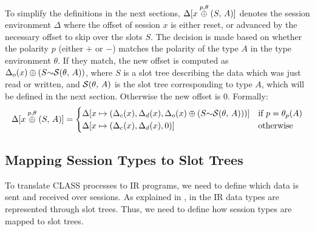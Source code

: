 To simplify the definitions in the next sections, $\Delta[x \overset{p,\theta}{\oplus} (S,\,A)]$ denotes the session environment $\Delta$ where the offset of session $x$ is either reset, or advanced by the necessary offset to skip over the slots $S$. The decision is made based on whether the polarity $p$ (either $+$ or $-$) matches the polarity of the type $A$ in the type environment $\theta$. If they match, the new offset is computed as $\Delta_o(x)\oplus(S\text{$\sim$}\mathcal{S}(\theta,\,A))$, where $S$ is a slot tree describing the data which was just read or written, and $\mathcal{S}(\theta,\,A)$ is the slot tree corresponding to type $A$, which will be defined in the next section. Otherwise the new offset is $0$. Formally:
\[
\Delta[x \overset{p,\theta}{\oplus} (S,\,A)] = \begin{cases}
    \Delta[x \mapsto (\Delta_c(x), \Delta_d(x), \Delta_o(x)\oplus(S\text{$\sim$}\mathcal{S}(\theta,\,A)))] & \text{if } p = \theta_{p}(A) \\
    \Delta[x \mapsto (\Delta_c(x), \Delta_d(x), 0)] & \text{otherwise}
\end{cases}
\]

\subsection{Mapping Session Types to Slot Trees} \label{subsection:MappingSessionTypesToSlots}

To translate \ac{CLASS} processes to \ac{IR} programs, we need to define which data is sent and received over sessions. As explained in , in the \ac{IR} data types are represented through slot trees. Thus, we need to define how session types are mapped to slot trees.

